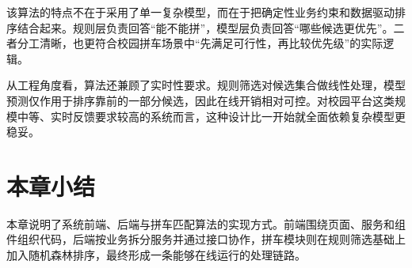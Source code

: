 该算法的特点不在于采用了单一复杂模型，而在于把确定性业务约束和数据驱动排序结合起来。规则层负责回答“能不能拼”，模型层负责回答“哪些候选更优先”。二者分工清晰，也更符合校园拼车场景中“先满足可行性，再比较优先级”的实际逻辑。

从工程角度看，算法还兼顾了实时性要求。规则筛选对候选集合做线性处理，模型预测仅作用于排序靠前的一部分候选，因此在线开销相对可控。对校园平台这类规模中等、实时反馈要求较高的系统而言，这种设计比一开始就全面依赖复杂模型更稳妥。

\section{本章小结}

本章说明了系统前端、后端与拼车匹配算法的实现方式。前端围绕页面、服务和组件组织代码，后端按业务拆分服务并通过接口协作，拼车模块则在规则筛选基础上加入随机森林排序，最终形成一条能够在线运行的处理链路。




